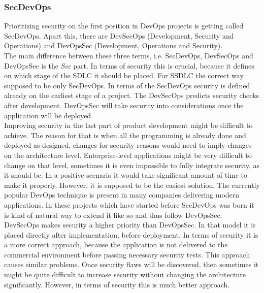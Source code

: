 \documentclass{article} %
\begin{document}
\subsubsection{SecDevOps}
Prioritizing security on the first position in DevOps projects is getting called SecDevOps. Apart this, there are DevSecOps (Development, Security and Operations) and DevOpsSec (Development, Operations and Security).\\
\newline
The main difference between these three terms, i.e. SecDevOps, DevSecOps and DevOpsSec is the \textit{Sec} part. In terms of security this is crucial, because it defines on which stage of the SDLC it should be placed. For SSDLC the correct way supposed to be only SecDevOps. In terms of the SecDevOps security is defined already on the earliest stage of a project. The DevSecOps predicts security checks after development. DevOpsSec will take security into considerations once the application will be deployed.\\
\newline
Improving security in the last part of product development might be difficult to achieve. The reason for that is when all the programming is already done and deployed as designed, changes for security reasons would need to imply changes on the architecture level. Enterprise-level applications might be very difficult to change on that level, sometimes it is even impossible to fully integrate security, as it should be. In a positive scenario it would take significant amount of time to make it properly. However, it is supposed to be the easiest solution. The currently popular DevOps technique is present in many companies delivering modern applications. In these projects which have started before SecDevOps was born it is kind of natural way to extend it like so and thus follow DevOpsSec.\\
\newline
DevSecOps makes security a higher priority than DevOpsSec. In that model it is placed directly after implementation, before deployment. In terms of security it is a more correct approach, because the application is not delivered to the commercial environment before passing necessary security tests. This approach causes similar problems. Once security flaws will be discovered, then sometimes it might be quite difficult to increase security without changing the architecture significantly. However, in terms of security this is much better approach.\\
\end{document}
